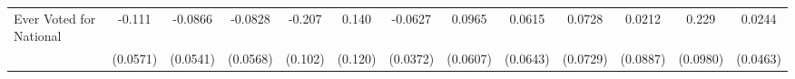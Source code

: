 {\begin{tabular}{l*{12}{c}}
\addlinespace
Ever Voted for National&      -0.111         &     -0.0866         &     -0.0828         &      -0.207\sym{*}  &       0.140         &     -0.0627         &      0.0965         &      0.0615         &      0.0728         &      0.0212         &       0.229\sym{*}  &      0.0244         \\
            &    (0.0571)         &    (0.0541)         &    (0.0568)         &     (0.102)         &     (0.120)         &    (0.0372)         &    (0.0607)         &    (0.0643)         &    (0.0729)         &    (0.0887)         &    (0.0980)         &    (0.0463)         \\
\bottomrule
\end{tabular}
}

